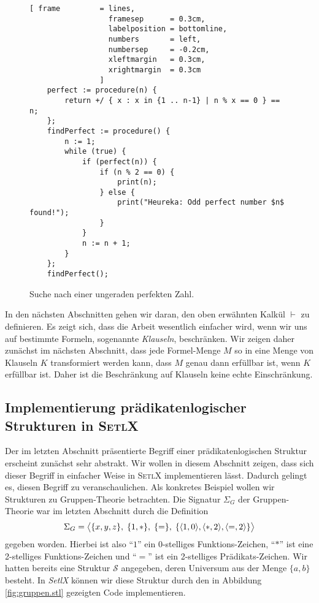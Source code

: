 \begin{figure}[!ht]
  \centering
\begin{Verbatim}[ frame         = lines, 
                  framesep      = 0.3cm, 
                  labelposition = bottomline,
                  numbers       = left,
                  numbersep     = -0.2cm,
                  xleftmargin   = 0.3cm,
                  xrightmargin  = 0.3cm
                ]
    perfect := procedure(n) {
        return +/ { x : x in {1 .. n-1} | n % x == 0 } == n;
    };    
    findPerfect := procedure() {
        n := 1;
        while (true) {
            if (perfect(n)) {
                if (n % 2 == 0) {
                    print(n);
                } else {
                    print("Heureka: Odd perfect number $n$ found!");
                }
            } 
            n := n + 1;
        }
    };
    findPerfect();
\end{Verbatim}
\vspace*{-0.3cm}
  \caption{Suche nach einer ungeraden perfekten Zahl.}
  \label{fig:find-perfect.stlx}
\end{figure} 


In den n\"{a}chsten Abschnitten gehen wir daran, den oben erw\"{a}hnten Kalk\"{u}l $\vdash$ zu definieren.
Es zeigt sich, dass die Arbeit wesentlich einfacher wird, wenn wir uns auf bestimmte
Formeln, sogenannte \emph{Klauseln}, beschr\"{a}nken.  Wir zeigen daher zun\"{a}chst im n\"{a}chsten
Abschnitt, dass jede Formel-Menge $M$ so in eine Menge von Klauseln $K$ transformiert
werden kann, dass $M$ genau dann erf\"{u}llbar ist, wenn $K$ erf\"{u}llbar ist.  Daher ist die
Beschr\"{a}nkung auf Klauseln keine echte Einschr\"{a}nkung.


\subsection{Implementierung pr\"{a}dikatenlogischer Strukturen in \textsc{SetlX}}
Der im letzten Abschnitt pr\"{a}sentierte Begriff einer pr\"{a}dikatenlogischen Struktur erscheint zun\"{a}chst
sehr abstrakt.  Wir wollen in diesem Abschnitt zeigen, dass sich dieser Begriff in einfacher Weise in
\textsc{SetlX} implementieren l\"{a}sst.  Dadurch gelingt es, diesen Begriff zu veranschaulichen.  Als konkretes
Beispiel wollen wir Strukturen zu Gruppen-Theorie betrachten.  Die Signatur $\Sigma_G$ der
Gruppen-Theorie war im letzten Abschnitt durch die Definition
\[ \Sigma_G = 
   \bigl\langle \{x,y,z\},\; \{1,*\},\; \{=\},\; \{ \pair(1,0), \pair(*,2), \pair(=,2) \} \bigr\rangle 
\]
gegeben worden.  Hierbei ist also ``$1$'' ein 0-stelliges Funktions-Zeichen, ``$*$'' ist
eine 2-stelliges Funktions-Zeichen und ``$=$'' ist ein 2-stelliges Pr\"{a}dikats-Zeichen.
Wir hatten bereits eine Struktur $\mathcal{S}$ angegeben, deren Universum aus der Menge
$\{ a, b \}$ besteht.  In \textsl{SetlX} k\"{o}nnen wir diese Struktur durch den in Abbildung
\ref{fig:gruppen.stl} gezeigten Code implementieren.

